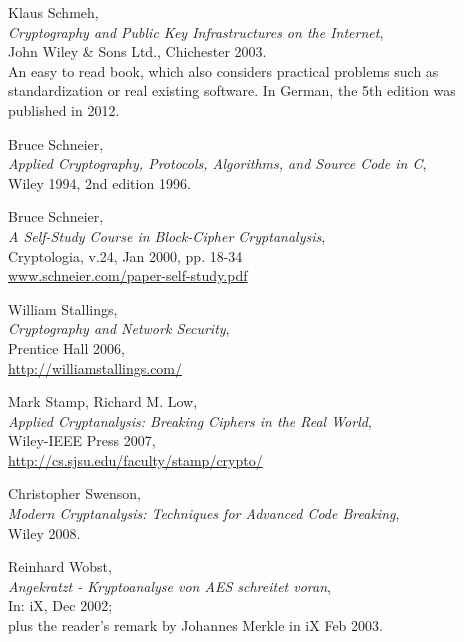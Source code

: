 \begin{thebibliography}{99999}
  
       Klaus Schmeh, \\
       {\em Cryptography and Public Key Infrastructures on the Internet},\\ 
       John Wiley \& Sons Ltd., Chichester 2003. \\
       An easy to read book, which also considers practical
       problems such as standardization or real existing software.
       In German, the 5th edition was published in 2012.

  
       Bruce Schneier, \\
       {\em Applied Cryptography, Protocols, Algorithms, and Source Code in C}, \\
       Wiley 1994, 2nd edition 1996.

  
       Bruce Schneier, \\
       {\em A Self-Study Course in Block-Cipher Cryptanalysis}, \\
       Cryptologia, v.24, Jan 2000, pp. 18-34\\
       \url{www.schneier.com/paper-self-study.pdf}

  
       William Stallings, \\
       {\em Cryptography and Network Security}, \\
       Prentice Hall 2006,\\
       \url{http://williamstallings.com/}

  
       Mark Stamp, Richard M. Low, \\
       {\em Applied Cryptanalysis: Breaking Ciphers in the Real World}, \\
       Wiley-IEEE Press 2007, \\
       \url{http://cs.sjsu.edu/faculty/stamp/crypto/}

  
       Christopher Swenson, \\
       {\em Modern Cryptanalysis: Techniques for Advanced Code Breaking}, \\
       Wiley 2008.

  
       Reinhard Wobst, \\
       {\em Angekratzt - Kryptoanalyse von AES schreitet voran}, \\
       In: iX, Dec 2002; \\
       plus the reader's remark by Johannes Merkle in iX Feb 2003.

\end{thebibliography}



